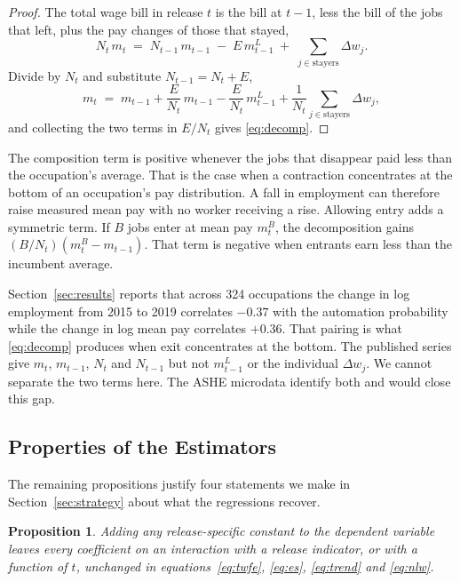 \documentclass[12pt,leqno]{article}
\newtheorem{proposition}{Proposition}
\begin{document}
\begin{proof}
The total wage bill in release $t$ is the bill at $t-1$, less the bill of the jobs that left, plus the pay changes of those that stayed,
\begin{equation}
N_t\, m_t \;=\; N_{t-1}\, m_{t-1} \;-\; E\, m^{L}_{t-1} \;+\; \sum_{j \in \mathrm{stayers}} \Delta w_j .
\end{equation}
Divide by $N_t$ and substitute $N_{t-1} = N_t + E$,
\begin{equation}
m_t \;=\; m_{t-1} + \frac{E}{N_t}\, m_{t-1} - \frac{E}{N_t}\, m^{L}_{t-1} + \frac{1}{N_t}\sum_{j \in \mathrm{stayers}} \Delta w_j ,
\end{equation}
and collecting the two terms in $E / N_t$ gives \eqref{eq:decomp}.
\end{proof}

The composition term is positive whenever the jobs that disappear paid less than the occupation's average. That is the case when a contraction concentrates at the bottom of an occupation's pay distribution. A fall in employment can therefore raise measured mean pay with no worker receiving a rise. Allowing entry adds a symmetric term. If $B$ jobs enter at mean pay $m^{B}_{t}$, the decomposition gains $(B / N_t)(m^{B}_{t} - m_{t-1})$. That term is negative when entrants earn less than the incumbent average.

Section~\ref{sec:results} reports that across 324 occupations the change in log employment from 2015 to 2019 correlates $-0.37$ with the automation probability while the change in log mean pay correlates $+0.36$. That pairing is what \eqref{eq:decomp} produces when exit concentrates at the bottom. The published series give $m_t$, $m_{t-1}$, $N_t$ and $N_{t-1}$ but not $m^{L}_{t-1}$ or the individual $\Delta w_j$. We cannot separate the two terms here. The ASHE microdata identify both and would close this gap.

\subsection{Properties of the Estimators}

The remaining propositions justify four statements we make in Section~\ref{sec:strategy} about what the regressions recover.

\begin{proposition}\label{prop:deflator}
Adding any release-specific constant to the dependent variable leaves every coefficient on an interaction with a release indicator, or with a function of $t$, unchanged in equations~\eqref{eq:twfe}, \eqref{eq:es}, \eqref{eq:trend} and \eqref{eq:nlw}.
\end{proposition}
\end{document}
